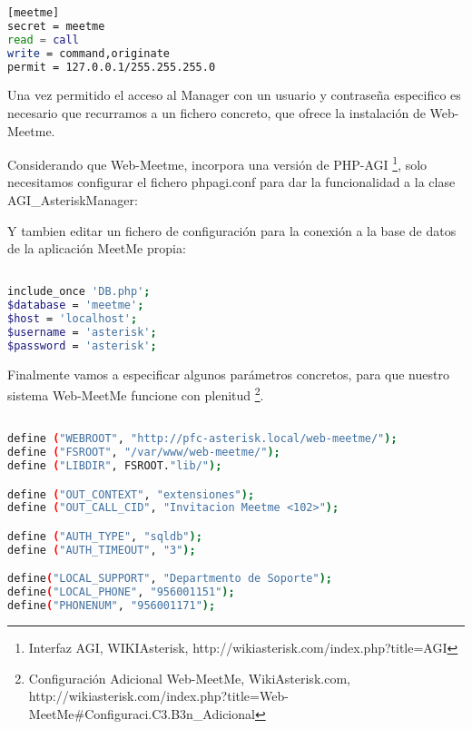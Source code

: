 {\begin{lstlisting}[language=bash,title={/etc/asterisk/manager.conf}]
[meetme]
secret = meetme 
read = call
write = command,originate
permit = 127.0.0.1/255.255.255.0

\end{lstlisting}

Una vez permitido el acceso al Manager con un usuario y contraseña especifico es necesario que recurramos a un fichero concreto, que ofrece la instalación de Web-Meetme. 

Considerando que Web-Meetme, incorpora una versión de PHP-AGI \footnote{Interfaz AGI, WIKIAsterisk, http://wikiasterisk.com/index.php?title=AGI}, solo necesitamos configurar el fichero phpagi.conf para dar la funcionalidad a la clase AGI\_AsteriskManager:



Y tambien editar un fichero de configuración para la conexión a la base de datos de la aplicación MeetMe propia:

\begin{lstlisting}[language=bash,title={/var/www/web-meetme/lib/database.php}]

include_once 'DB.php';
$database = 'meetme';
$host = 'localhost';
$username = 'asterisk';
$password = 'asterisk';

\end{lstlisting}

Finalmente vamos a especificar algunos parámetros concretos, para que nuestro sistema Web-MeetMe funcione con plenitud \footnote{Configuración Adicional Web-MeetMe, WikiAsterisk.com, \\ http://wikiasterisk.com/index.php?title=Web-MeetMe\#Configuraci.C3.B3n\_Adicional}.

\begin{lstlisting}[language=bash,title={/var/www/web-meetme/lib/defines.php}]

define ("WEBROOT", "http://pfc-asterisk.local/web-meetme/");
define ("FSROOT", "/var/www/web-meetme/");
define ("LIBDIR", FSROOT."lib/");

define ("OUT_CONTEXT", "extensiones");
define ("OUT_CALL_CID", "Invitacion Meetme <102>");

define ("AUTH_TYPE", "sqldb");
define ("AUTH_TIMEOUT", "3");

define("LOCAL_SUPPORT", "Departmento de Soporte");
define("LOCAL_PHONE", "956001151");
define("PHONENUM", "956001171");

\end{lstlisting}

}
